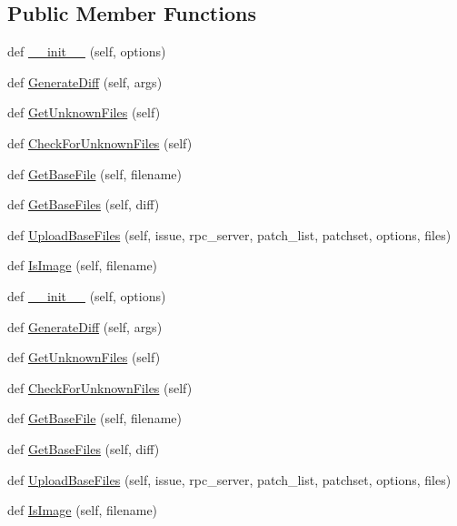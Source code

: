 \subsection*{Public Member Functions}
\begin{DoxyCompactItemize}
\item 
def \hyperlink{classupload_1_1VersionControlSystem_ace97e5785a2b40011404ae6fbb956ecf}{\+\_\+\+\_\+init\+\_\+\+\_\+} (self, options)
\item 
def \hyperlink{classupload_1_1VersionControlSystem_aa5eb260c96e7016dab36b5fc136c9f49}{Generate\+Diff} (self, args)
\item 
def \hyperlink{classupload_1_1VersionControlSystem_a56a60e56aa9aff3df4001d2f84cab884}{Get\+Unknown\+Files} (self)
\item 
def \hyperlink{classupload_1_1VersionControlSystem_ad2923d691a1b1047e9359c5b7c1c103f}{Check\+For\+Unknown\+Files} (self)
\item 
def \hyperlink{classupload_1_1VersionControlSystem_adfd9d4ecba422102233a2ba13e5bfaf5}{Get\+Base\+File} (self, filename)
\item 
def \hyperlink{classupload_1_1VersionControlSystem_a812c3b3daf90c88b015fa4b26252e291}{Get\+Base\+Files} (self, diff)
\item 
def \hyperlink{classupload_1_1VersionControlSystem_a7e334f967301b9e85e5a9c39f5036823}{Upload\+Base\+Files} (self, issue, rpc\+\_\+server, patch\+\_\+list, patchset, options, files)
\item 
def \hyperlink{classupload_1_1VersionControlSystem_a846889ecd2ef40870b456ddb5b349e02}{Is\+Image} (self, filename)
\item 
def \hyperlink{classupload_1_1VersionControlSystem_ace97e5785a2b40011404ae6fbb956ecf}{\+\_\+\+\_\+init\+\_\+\+\_\+} (self, options)
\item 
def \hyperlink{classupload_1_1VersionControlSystem_aa5eb260c96e7016dab36b5fc136c9f49}{Generate\+Diff} (self, args)
\item 
def \hyperlink{classupload_1_1VersionControlSystem_a56a60e56aa9aff3df4001d2f84cab884}{Get\+Unknown\+Files} (self)
\item 
def \hyperlink{classupload_1_1VersionControlSystem_ad2923d691a1b1047e9359c5b7c1c103f}{Check\+For\+Unknown\+Files} (self)
\item 
def \hyperlink{classupload_1_1VersionControlSystem_adfd9d4ecba422102233a2ba13e5bfaf5}{Get\+Base\+File} (self, filename)
\item 
def \hyperlink{classupload_1_1VersionControlSystem_a812c3b3daf90c88b015fa4b26252e291}{Get\+Base\+Files} (self, diff)
\item 
def \hyperlink{classupload_1_1VersionControlSystem_a7e334f967301b9e85e5a9c39f5036823}{Upload\+Base\+Files} (self, issue, rpc\+\_\+server, patch\+\_\+list, patchset, options, files)
\item 
def \hyperlink{classupload_1_1VersionControlSystem_a846889ecd2ef40870b456ddb5b349e02}{Is\+Image} (self, filename)
\end{DoxyCompactItemize}
